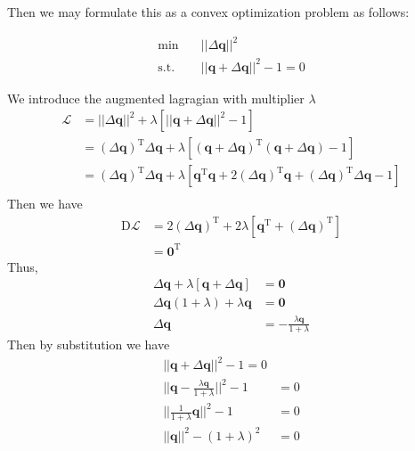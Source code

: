 \documentclass{article}
\newcommand{\transpose}[1]{#1^\mathrm{T}}
\begin{document}
Then we may formulate this as a convex optimization problem as follows:

\begin{align}
	\min \quad          & || \Delta \pmb{q} ||^2                  \\
	\mathrm{s.t.} \quad & || \pmb{q} + \Delta \pmb{q} ||^2 -1 = 0
\end{align}

We introduce the augmented lagragian with multiplier $\lambda$
\begin{align*}
	\mathcal{L} & = || \Delta \pmb{q} ||^2 + \lambda \left[ || \pmb{q} + \Delta \pmb{q} ||^2 - 1 \right]                                                                                                                                            \\
	            & = \transpose{\left(\Delta \pmb{q} \right)} \Delta \pmb{q} + \lambda \left[ \transpose{\left(\pmb{q} + \Delta \pmb{q}\right)} \left(\pmb{q} + \Delta \pmb{q} \right) - 1 \right]                                                   \\
	            & = \transpose{\left(\Delta \pmb{q} \right)} \Delta \pmb{q} + \lambda \left[ \transpose{\pmb{q}} \pmb{q} + 2\transpose{\left(\Delta \pmb{q} \right)} \pmb{q} + \transpose{\left(\Delta \pmb{q} \right)} \Delta \pmb{q}  - 1 \right] \\
\end{align*}
Then we have
\begin{align*}
	\mathrm{D}\mathcal{L} & = 2 \transpose{\left(\Delta \pmb{q} \right)} + 2 \lambda \left[ \transpose{\pmb{q}} + \transpose{\left(\Delta \pmb{q} \right)} \right] \\
	                      & = \transpose{\pmb{0}}
\end{align*}
Thus,
\begin{align*}
	\Delta \pmb{q} + \lambda \left[ \pmb{q} + \Delta \pmb{q} \right] & = \pmb{0}                              \\
	\Delta \pmb{q} (1 + \lambda) + \lambda \pmb{q}                   & = \pmb{0}                              \\
	\Delta \pmb{q}                                                   & = -\frac{\lambda \pmb{q}}{1 + \lambda}
\end{align*}
Then by substitution we have
\begin{align*}
	|| \pmb{q} + \Delta \pmb{q} ||^2 -1 = 0                         \\
	|| \pmb{q} - \frac{\lambda \pmb{q}}{1 + \lambda} ||^2 - 1 & = 0 \\
	|| \frac{1}{1 + \lambda} \pmb{q} ||^2 - 1                 & = 0 \\
	|| \pmb{q} ||^2 - (1+\lambda)^2                           & = 0 \\
\end{align*}
\end{document}
